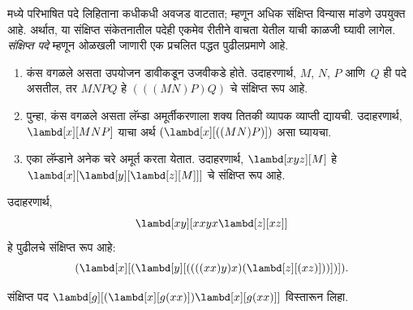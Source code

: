 \documentclass[../../../include/open-logic-section]{subfiles}
\begin{document}

 मध्ये परिभाषित पदे लिहिताना
कधीकधी अवजड वाटतात; म्हणून अधिक संक्षिप्त विन्यास
मांडणे उपयुक्त आहे. अर्थात, या संक्षिप्त संकेतनातील
पदेही एकमेव रीतीने वाचता येतील याची काळजी
घ्यावी लागेल. \emph{संक्षिप्त पदे} म्हणून ओळखली
जाणारी एक प्रचलित पद्धत पुढीलप्रमाणे आहे.

\begin{enumerate}
\item कंस वगळले असता उपयोजन डावीकडून उजवीकडे
  होते. उदाहरणार्थ, $M$, $N$, $P$ आणि~$Q$
  ही पदे असतील, तर $MNPQ$ हे $(((MN)P)Q)$
  चे संक्षिप्त रूप आहे.
\item पुन्हा, कंस वगळले असता लॅम्डा अमूर्तीकरणाला
  शक्य तितकी व्यापक व्याप्ती द्यायची. उदाहरणार्थ,
  $\lambd[x][MNP]$ याचा अर्थ
  $(\lambd[x][((MN)P)])$ असा घ्यायचा.
\item एका लॅम्डाने अनेक चरे अमूर्त करता येतात.
  उदाहरणार्थ, $\lambd[xyz][M]$ हे
  $\lambd[x][\lambd[y][\lambd[z][M]]]$
  चे संक्षिप्त रूप आहे.
\end{enumerate}

उदाहरणार्थ,
\[
\lambd[xy][xxyx \lambd[z][xz]]
\]
हे पुढीलचे संक्षिप्त रूप आहे:
\[
(\lambd[x][(\lambd[y][((((xx)y)x)(\lambd[z][(xz)]))])]).
\]

\begin{prob}
संक्षिप्त पद
$\lambd[g][(\lambd[x][g (x x)])
  \lambd[x][g (x x)]]$
विस्तारून लिहा.
\end{prob}
\end{document}
